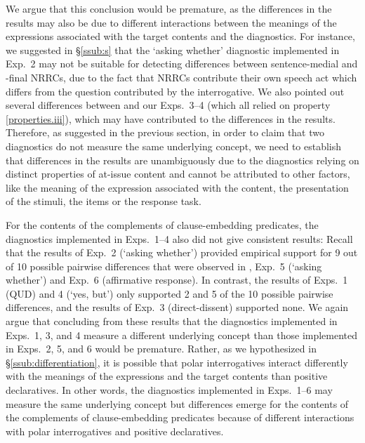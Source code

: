 \documentclass[times,linguex]{glossa}
\begin{document}
We argue that this conclusion would be premature, as the differences in the results may also be due to different interactions between the meanings of the expressions associated with the target contents and the diagnostics. For instance, we suggested in \S\ref{ssub:s} that the `asking whether' diagnostic implemented in Exp.~2 may not be suitable for detecting differences between sentence-medial and -final NRRCs, due to the fact that NRRCs contribute their own speech act which differs from the question contributed by the interrogative. We also pointed out several differences between \citealt[Exp.~2]{syrett_experimental_2015} and our Exps.~3--4 (which all relied on property \ref{properties.iii}), which may have contributed to the differences in the results. Therefore, as suggested in the previous section, in order to claim that two diagnostics do not measure the same underlying concept, we need to establish that differences in the results are unambiguously due to the diagnostics relying on distinct properties of at-issue content and cannot be attributed to other factors, like the meaning of the expression associated with the content, the presentation of the stimuli, the items or the response task.

For the contents of the complements of clause-embedding predicates, the diagnostics implemented in Exps.~1--4 also did not give consistent results: Recall that the results of Exp.~2 (`asking whether') provided empirical support for 9 out of 10 possible pairwise differences that were observed in \citealt{degen_projection_2025}, Exp.~5 (`asking whether') and Exp.~6 (affirmative response). In contrast, the results of Exps.~1 (QUD)  and 4 (`yes, but') only supported 2 and 5 of the 10 possible pairwise differences, and the results of Exp.~3 (direct-dissent) supported none. We again argue that concluding from these results that the diagnostics implemented in Exps.~1, 3, and 4 measure a different underlying concept than those implemented in Exps.~2, 5, and 6 would be premature. Rather, as we hypothesized in \S\ref{ssub:differentiation}, it is possible that polar interrogatives interact differently with the meanings of the expressions and the target contents than positive declaratives. In other words, the diagnostics implemented in Exps.~1--6 may measure the same underlying concept but differences emerge for the contents of the complements of clause-embedding predicates because of different interactions with polar interrogatives and positive declaratives.
\end{document}
